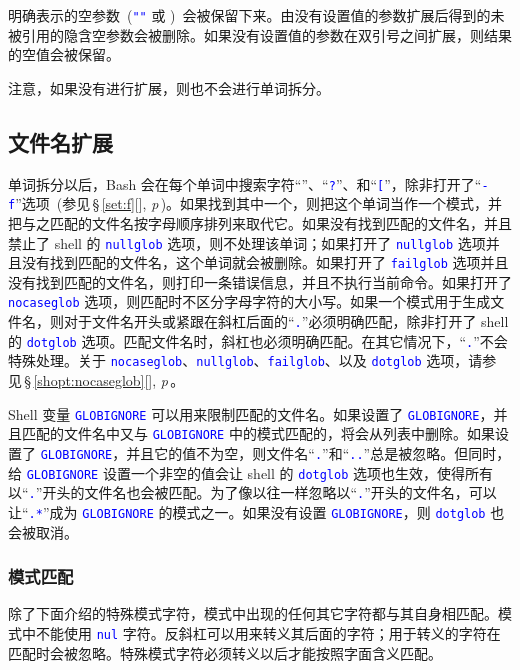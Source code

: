 \documentclass[openany,notitlepage]{book}
\newcommand{\code}[1]{\textcolor{blue}{{\tt #1}}}
\newcommand{\fullref}[1]{\,\S\,\ref{#1}[\nameref{#1}], \textit{p\pageref{#1}}\,}
\begin{document}
\begin{CJK}{UTF8}{song}
明确表示的空参数~(\code{""} 或 \code{\char13})~会被保留下来。由没有设置值的参数扩展后得到的未被引用的隐含空参数会被删除。如果没有设置值的参数在双引号之间扩展，则结果的空值会被保留。

注意，如果没有进行扩展，则也不会进行单词拆分。

\subsection{文件名扩展}\label{filename-expansion} %
单词拆分以后，Bash 会在每个单词中搜索字符``\code{*}''、``\code{?}''、和``\code{[}''，除非打开了``\code{-f}''选项~(参见\fullref{set:f})。如果找到其中一个，则把这个单词当作一个模式，并把与之匹配的文件名按字母顺序排列来取代它。如果没有找到匹配的文件名，并且禁止了 shell 的 \code{nullglob} 选项，则不处理该单词；如果打开了 \code{nullglob} 选项并且没有找到匹配的文件名，这个单词就会被删除。如果打开了 \code{failglob} 选项并且没有找到匹配的文件名，则打印一条错误信息，并且不执行当前命令。如果打开了 \code{nocaseglob} 选项，则匹配时不区分字母字符的大小写。如果一个模式用于生成文件名，则对于文件名开头或紧跟在斜杠后面的``\code{.}''必须明确匹配，除非打开了 shell 的 \code{dotglob} 选项。匹配文件名时，斜杠也必须明确匹配。在其它情况下，``\code{.}''不会特殊处理。关于 \code{nocaseglob}、\code{nullglob}、\code{failglob}、以及 \code{dotglob} 选项，请参见\fullref{shopt:nocaseglob}。

Shell 变量 \code{GLOBIGNORE} 可以用来限制匹配的文件名。如果设置了 \code{GLOBIGNORE}，并且匹配的文件名中又与 \code{GLOBIGNORE} 中的模式匹配的，将会从列表中删除。如果设置了 \code{GLOBIGNORE}，并且它的值不为空，则文件名``\code{.}''和``\code{..}''总是被忽略。但同时，给 \code{GLOBIGNORE} 设置一个非空的值会让 shell 的 \code{dotglob} 选项也生效，使得所有以``\code{.}''开头的文件名也会被匹配。为了像以往一样忽略以``\code{.}''开头的文件名，可以让``\code{.*}''成为 \code{GLOBIGNORE} 的模式之一。如果没有设置 \code{GLOBIGNORE}，则 \code{dotglob} 也会被取消。

\subsubsection{模式匹配}\label{pattern-matching} %
除了下面介绍的特殊模式字符，模式中出现的任何其它字符都与其自身相匹配。模式中不能使用 \code{nul} 字符。反斜杠可以用来转义其后面的字符；用于转义的字符在匹配时会被忽略。特殊模式字符必须转义以后才能按照字面含义匹配。


\end{CJK}
\end{document}
